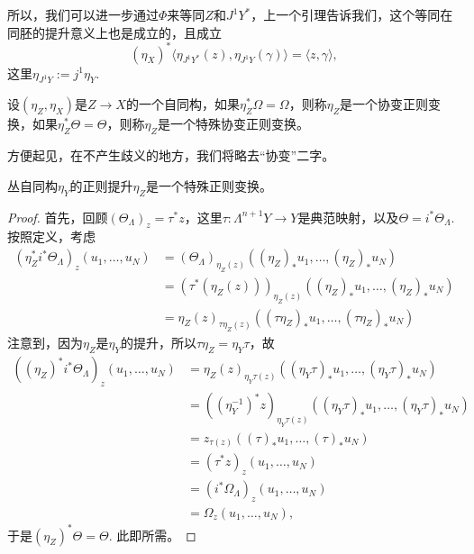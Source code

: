 所以，我们可以进一步通过$\Phi$来等同$Z$和$J^1Y^*$，上一个引理告诉我们，这个等同在同胚的提升意义上也是成立的，且成立
\[
	(\eta_{X})^*\langle \eta_{J^1Y^*}(z),\eta_{J^1Y}(\gamma)\rangle=\langle z,\gamma\rangle,
\]
这里$\eta_{J^1Y}:=j^1\eta_Y$.

\begin{para}[协变正则变换]
    设$(\eta_Z,\eta_X)$是$Z\to X$的一个自同构，如果$\eta_Z^*\Omega=\Omega$，则称$\eta_Z$是一个协变正则变换，如果$\eta_Z^*\Theta=\Theta$，则称$\eta_Z$是一个特殊协变正则变换。
\end{para}

方便起见，在不产生歧义的地方，我们将略去“协变”二字。

\begin{pro}
    丛自同构$\eta_Y$的正则提升$\eta_{Z}$是一个特殊正则变换。
\end{pro}

\begin{proof}
    首先，回顾$(\Theta_\Lambda)_z=\tau^*z$，这里$\tau:\Lambda^{n+1}Y\to Y$是典范映射，以及$\Theta=i^*\Theta_\Lambda$. 按照定义，考虑
    \begin{align*}
        (\eta_{Z}^*i^*\Theta_\Lambda)_z(u_1,\dots,u_N)&=(\Theta_\Lambda)_{\eta_{Z}(z)}((\eta_{Z})_{*}u_1,\dots,(\eta_{Z})_{*}u_N)\\
        &=(\tau^* (\eta_{Z}(z)))_{\eta_{Z}(z)}((\eta_{Z})_{*}u_1,\dots,(\eta_{Z})_{*}u_N)\\ 
        &=\eta_{Z}(z)_{\tau\eta_{Z}(z)}((\tau\eta_{Z})_{*}u_1,\dots,(\tau\eta_{Z})_{*}u_N)
    \end{align*}
    注意到，因为$\eta_Z$是$\eta_Y$的提升，所以$\tau\eta_Z=\eta_Y \tau$，故
    \begin{align*}
        ((\eta_{Z})^*i^*\Theta_\Lambda)_z(u_1,\dots,u_N)&=
        \eta_{Z}(z)_{\eta_{Y}\tau(z)}((\eta_{Y}\tau)_{*}u_1,\dots,(\eta_{Y}\tau)_{*}u_N)\\
        &=((\eta_Y^{-1})^*z)_{\eta_{Y}\tau(z)}((\eta_{Y}\tau)_{*}u_1,\dots,(\eta_{Y}\tau)_{*}u_N)\\
        &=z_{\tau(z)}((\tau)_{*}u_1,\dots,(\tau)_{*}u_N)\\
        &=(\tau^*z)_z(u_1,\dots,u_N)\\
        &=(i^*\Omega_\Lambda)_z(u_1,\dots,u_N)\\
        &=\Omega_z(u_1,\dots,u_N),
    \end{align*}
    于是$(\eta_{Z})^*\Theta=\Theta$. 此即所需。
\end{proof}

